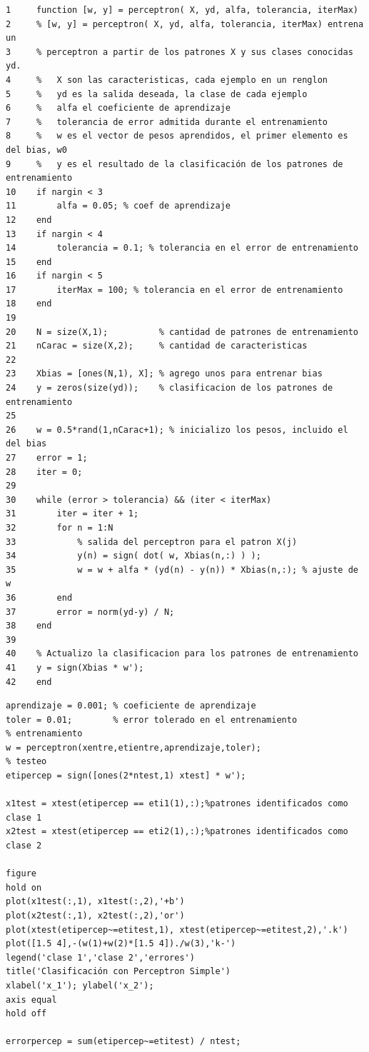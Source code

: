 \documentclass[11pt,a4paper,final]{article}
\begin{document}
\begin{verbatim}
1     function [w, y] = perceptron( X, yd, alfa, tolerancia, iterMax)
2     % [w, y] = perceptron( X, yd, alfa, tolerancia, iterMax) entrena un 
3     % perceptron a partir de los patrones X y sus clases conocidas yd.
4     %   X son las caracteristicas, cada ejemplo en un renglon
5     %   yd es la salida deseada, la clase de cada ejemplo
6     %   alfa el coeficiente de aprendizaje
7     %   tolerancia de error admitida durante el entrenamiento
8     %   w es el vector de pesos aprendidos, el primer elemento es del bias, w0
9     %   y es el resultado de la clasificación de los patrones de entrenamiento 
10    if nargin < 3
11        alfa = 0.05; % coef de aprendizaje
12    end
13    if nargin < 4
14        tolerancia = 0.1; % tolerancia en el error de entrenamiento
15    end
16    if nargin < 5
17        iterMax = 100; % tolerancia en el error de entrenamiento
18    end
19    
20    N = size(X,1);          % cantidad de patrones de entrenamiento
21    nCarac = size(X,2);     % cantidad de caracteristicas
22    
23    Xbias = [ones(N,1), X]; % agrego unos para entrenar bias
24    y = zeros(size(yd));    % clasificacion de los patrones de entrenamiento
25    
26    w = 0.5*rand(1,nCarac+1); % inicializo los pesos, incluido el del bias
27    error = 1;
28    iter = 0;
29    
30    while (error > tolerancia) && (iter < iterMax)
31        iter = iter + 1;
32        for n = 1:N
33            % salida del perceptron para el patron X(j)
34            y(n) = sign( dot( w, Xbias(n,:) ) );
35            w = w + alfa * (yd(n) - y(n)) * Xbias(n,:); % ajuste de w
36        end
37        error = norm(yd-y) / N;
38    end
39    
40    % Actualizo la clasificacion para los patrones de entrenamiento
41    y = sign(Xbias * w');
42    end
\end{verbatim}
    
\begin{verbatim}
aprendizaje = 0.001; % coeficiente de aprendizaje
toler = 0.01;        % error tolerado en el entrenamiento
% entrenamiento
w = perceptron(xentre,etientre,aprendizaje,toler);
% testeo
etipercep = sign([ones(2*ntest,1) xtest] * w');

x1test = xtest(etipercep == eti1(1),:);%patrones identificados como clase 1
x2test = xtest(etipercep == eti2(1),:);%patrones identificados como clase 2

figure
hold on
plot(x1test(:,1), x1test(:,2),'+b')
plot(x2test(:,1), x2test(:,2),'or')
plot(xtest(etipercep~=etitest,1), xtest(etipercep~=etitest,2),'.k')
plot([1.5 4],-(w(1)+w(2)*[1.5 4])./w(3),'k-')
legend('clase 1','clase 2','errores')
title('Clasificación con Perceptron Simple')
xlabel('x_1'); ylabel('x_2');
axis equal
hold off

errorpercep = sum(etipercep~=etitest) / ntest;
\end{verbatim}
\end{document}
